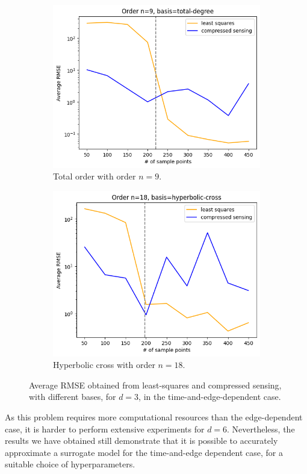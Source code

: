 \documentclass[12pt, oneside]{report}   	%
\begin{document}
\begin{figure}[t]
     \centering
     \begin{subfigure}[b]{0.45\textwidth}
         \centering
         \includegraphics[width=\textwidth]{img/Gtd3TD9.png}
         \caption{Total order with order $n=9$.}
         \label{fig:convTd3TD}
     \end{subfigure}
     \hfill
     \begin{subfigure}[b]{0.45\textwidth}
         \centering
         \includegraphics[width=\textwidth]{img/Gtd3HC18.png}
         \caption{Hyperbolic cross with order $n=18$.}
         \label{fig:convTd3HC}
     \end{subfigure}
        \caption{Average RMSE obtained from least-squares and compressed sensing, with different bases, for $d=3$, in the time-and-edge-dependent case.}
        \label{fig:convTd3}
\end{figure}
As this problem requires more computational resources than the edge-dependent case, it is harder to perform extensive experiments for $d=6$. Nevertheless, the results we have obtained still demonstrate that it is possible to accurately approximate a surrogate model for the time-and-edge dependent case, for a suitable choice of hyperparameters.
\end{document}
